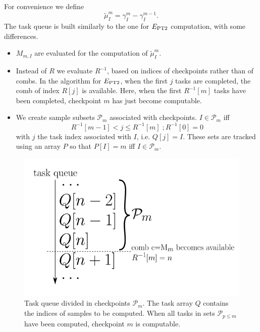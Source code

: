 \documentclass[./thesis.tex]{subfiles}
\begin{document}
For convenience we define
\begin{equation}
\tilde \mu^m_I = \gamma^m_I - \gamma^{m-1}_I.
\end{equation}
The task queue is built similarly to the one for $E_\text{PT2}$ computation, with some differences.
\begin{itemize}
\item
$M_{m,I}$ are evaluated for the computation of $\tilde \mu^m_I$.
\item
Instead of $R$ we evaluate $R^{-1}$, based on indices of checkpoints rather than of combs. In the algorithm for $E_\text{PT2}$, when the first $j$ tasks are completed, the comb of index $R[j]$ is available. Here, when the first $R^{-1}[m]$ tasks have been completed, checkpoint $m$ has just become computable.
\item
We create sample subsets $\mathcal{P}_m$ associated with checkpoints. $I \in \mathcal{P}_m$ iff
\begin{equation}
R^{-1}[m-1] < j \leq R^{-1}[m]  \;; R^{-1}[0] = 0
\end{equation}
with $j$ the task index associated with $I$, i.e. $Q[j]=I$. These sets are tracked using an array $P$ so that $P[I]=m$ iff $I \in \mathcal{P}_m$.

\end{itemize}

\begin{figure}[h!]
	\begin{center}
		\includegraphics[width=0.45\columnwidth]{figures/matrix_dressing/taskqueue}
		\caption{Task queue divided in checkpoints $\mathcal{P}_m$. The task array $Q$ contains the indices of samples to be computed. When all tasks in sets $\mathcal{P}_{p\leq m}$ have been computed, checkpoint $m$ is computable.
}
		\label{fig:task_queue}
	\end{center}
\end{figure}
\end{document}
